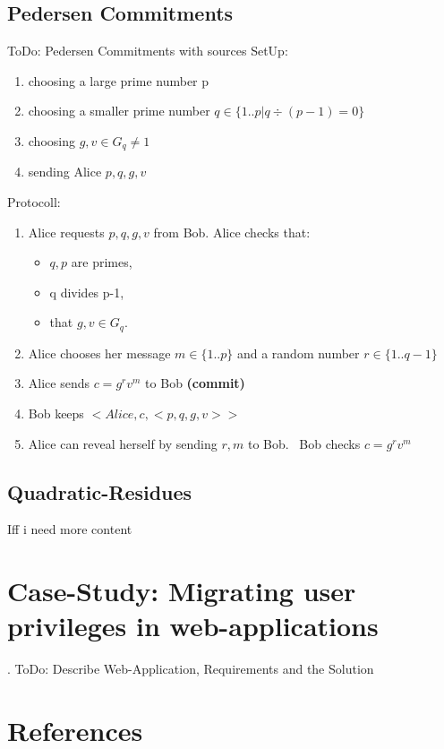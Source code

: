 \documentclass[conference]{IEEEtran}
\begin{document}
\subsection{Pedersen Commitments}
ToDo: Pedersen Commitments with sources
SetUp:
	\begin{enumerate}
		\item choosing a large prime number p
		\item choosing a smaller prime number $q \in \{1..p| q\div (p-1) = 0\}$
		\item choosing $g,v \in G_q \neq 1$
		\item sending Alice $p,q,g,v$ 
	\end{enumerate}
Protocoll: 
	\begin{enumerate}
		\item Alice requests $p,q,g,v$ from Bob. \newline Alice checks that:
		\begin{itemize}
			\item $q,p$ are primes, 
			\item q divides p-1, 
			\item that $g,v \in G_q$. 
		\end{itemize}
		\item Alice chooses her message $m \in \{1..p\}$ and a random number $r \in \{1..q-1\}$
		\item Alice sends $c = g^rv^m$ to Bob \textbf{(commit)}
		\item Bob keeps $<Alice,c,<p,q,g,v>>$
		\item Alice can reveal herself by sending $r,m$ to Bob. ~\newline Bob checks $c = g^rv^m$
	\end{enumerate}

\subsection{Quadratic-Residues}
Iff i need more content

\section{Case-Study: Migrating user privileges in web-applications}
\label{sec:casestudy}.
ToDo: Describe Web-Application, Requirements and the Solution

\section*{References}
\end{document}
